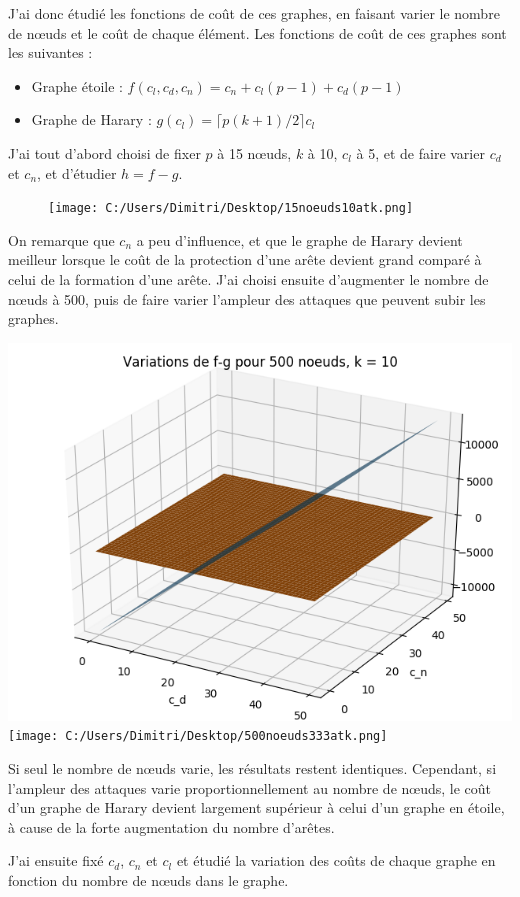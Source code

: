 \documentclass[12pt,a4paper]{article}
\begin{document}
J'ai donc étudié les fonctions de coût de ces graphes, en faisant varier le nombre de nœuds et le coût de chaque élément. Les fonctions de coût de ces graphes sont les suivantes :
\begin{itemize}
\item Graphe étoile : $f(c_{l},c_{d},c_{n}) = c_{n} + c_{l}(p-1) + c_{d}(p-1)$
\item Graphe de Harary : $g(c_{l}) = \lceil p(k+1)/2 \rceil c_{l}$
\end{itemize}

J'ai tout d'abord choisi de fixer $p$ à 15 nœuds, $k$ à 10, $c_{l}$ à 5, et de faire varier $c_{d}$ et $c_{n}$, et d'étudier $h = f-g$.
\begin{figure}[h]
	\centering
		\texttt{[image: C:/Users/Dimitri/Desktop/15noeuds10atk.png]}
\end{figure}

On remarque que $c_{n}$ a peu d'influence, et que le graphe de Harary devient meilleur lorsque le coût de la protection d'une arête devient grand comparé à celui de la formation d'une arête.
J'ai choisi ensuite d'augmenter le nombre de nœuds à 500, puis de faire varier l'ampleur des attaques que peuvent subir les graphes.

\begin{center}
\includegraphics[width=0.49\linewidth]{500noeuds10atk.png}
\texttt{[image: C:/Users/Dimitri/Desktop/500noeuds333atk.png]}
\end{center}

Si seul le nombre de nœuds varie, les résultats restent identiques. Cependant, si l'ampleur des attaques varie proportionnellement au nombre de nœuds, le coût d'un graphe de Harary devient largement supérieur à celui d'un graphe en étoile, à cause de la forte augmentation du nombre d'arêtes.

J'ai ensuite fixé $c_{d}$, $c_{n}$ et $c_{l}$ et étudié la variation des coûts de chaque graphe en fonction du nombre de nœuds dans le graphe.
\end{document}

